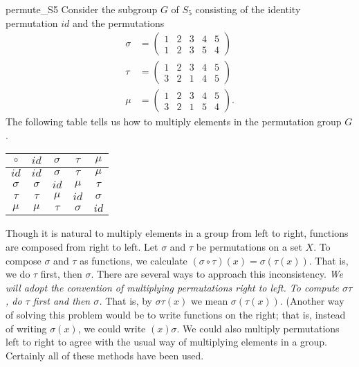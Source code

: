\begin{example}{permute_S5}
Consider the subgroup $G$ of $S_5$ consisting of the identity
permutation $id$ and the permutations 
\begin{align*}
\sigma
& =
\begin{pmatrix}
1 & 2 & 3 & 4 & 5 \\
1 & 2 & 3 & 5 & 4
\end{pmatrix} \\
\tau
& =
\begin{pmatrix}
1 & 2 & 3 & 4 & 5 \\
3 & 2 & 1 & 4 & 5
\end{pmatrix} \\
\mu
& =
\begin{pmatrix}
1 & 2 & 3 & 4 & 5 \\
3 & 2 & 1 & 5 & 4
\end{pmatrix}.
\end{align*}
The following table tells us how to multiply elements in the
permutation group $G$. 
\begin{center}
\begin{tabular}{c|cccc}
$\circ$  & $id$     & $\sigma$ & $\tau$   & $\mu$    \\
\hline
$id$     & $id$     & $\sigma$ & $\tau$   & $\mu$    \\
$\sigma$ & $\sigma$ & $id$     & $\mu$    & $\tau$   \\
$\tau$   & $\tau$   & $\mu$    & $id$     & $\sigma$ \\
$\mu$    & $\mu$    & $\tau$   & $\sigma$ & $id$
\end{tabular}
\end{center}
\end{example}
 
Though it is natural to multiply elements in a group from left to
right, functions are composed from right to left.  Let $\sigma$ and
$\tau$ be permutations on a set $X$. To compose $\sigma$ and $\tau$ as
functions, we calculate $(\sigma \circ \tau)(x) = \sigma( \tau(x))$.
That is, we do $\tau$ first, then $\sigma$. There are several ways to
approach this inconsistency. {\em We will adopt the convention of
multiplying permutations right to left. To compute $\sigma \tau$, do
$\tau$ first and then $\sigma$.} That is, by $\sigma \tau (x)$ we mean
$\sigma( \tau( x))$. (Another way of solving this problem would be to
write functions on the right; that is, instead of writing $\sigma(x)$,
we could write $(x)\sigma$. We could also multiply permutations left
to right to agree with the usual way of multiplying elements in a
group. Certainly all of these methods have been used. 
 
